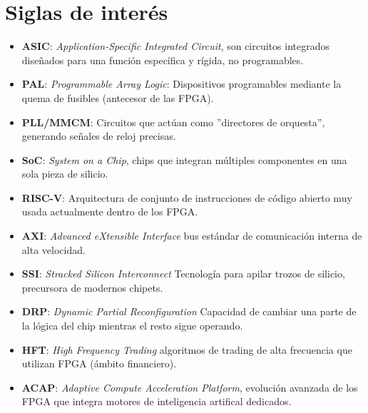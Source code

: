 \section{Siglas de interés}
\begin{itemize}
    \item \textbf{ASIC}: \textit{Application-Specific Integrated Circuit}, son circuitos integrados diseñados para una función específica y rígida, no programables. \cite{harris}
    \item \textbf{PAL}: \textit{Programmable Array Logic}: Dispositivos programables mediante la quema de fusibles (antecesor de las FPGA).
    \item \textbf{PLL/MMCM}: Circuitos que actúan como ''directores de orquesta'', generando señales de reloj precisas.
    \item \textbf{SoC}: \textit{System on a Chip}, chips que integran múltiples componentes en una sola pieza de silicio.
    \item \textbf{RISC-V}: Arquitectura de conjunto de instrucciones de código abierto muy usada actualmente dentro de los FPGA.
    \item \textbf{AXI}: \textit{Advanced eXtensible Interface} bus estándar de comunicación interna de alta velocidad.
    \item \textbf{SSI}: \textit{Stracked Silicon Interconnect} Tecnología para apilar trozos de silicio, precursora de modernos chipets.
    \item \textbf{DRP}: \textit{Dynamic Partial Reconfiguration} Capacidad de cambiar una parte de la lógica del chip mientras el resto sigue operando.
    \item \textbf{HFT}: \textit{High Frequency Trading} algoritmos de trading de alta frecuencia que utilizan FPGA (ámbito financiero).
    \item \textbf{ACAP}: \textit{Adaptive Compute Acceleration Platform}, evolución avanzada de los FPGA que integra motores de inteligencia artifical dedicados.
\end{itemize}

